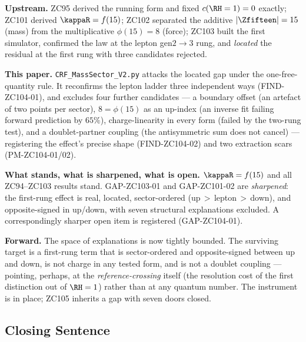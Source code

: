\documentclass[12pt, a4paper]{article}
\begin{document}
\begin{genealogybox}[title={How ZC104 Sharpens the Mass-Sector Gap}]
\textbf{Upstream.}
ZC95 derived the running form and fixed $c(\RH=1)=0$ exactly; ZC101 derived
$\kappaR=f(15)$; ZC102 separated the additive $|\Zfifteen|=15$ (mass) from the
multiplicative $\phi(15)=8$ (force); ZC103 built the first simulator, confirmed
the law at the lepton gen$2{\to}3$ rung, and \emph{located} the residual at the
first rung with three candidates rejected.

\textbf{This paper.}
\texttt{CRF\_MassSector\_V2.py} attacks the located gap under the one-free-
quantity rule. It reconfirms the lepton ladder three independent ways
(FIND-ZC104-01), and excludes four further candidates --- a boundary offset (an
artefact of two points per sector), $8=\phi(15)$ as an up-index (an inverse fit
failing forward prediction by $65\%$), charge-linearity in every form (failed by
the two-rung test), and a doublet-partner coupling (the antisymmetric sum does
not cancel) --- registering the effect's precise shape (FIND-ZC104-02) and two
extraction scars (PM-ZC104-01/02).

\textbf{What stands, what is sharpened, what is open.}
$\kappaR=f(15)$ and all ZC94--ZC103 results stand. GAP-ZC103-01 and GAP-ZC101-02
are \emph{sharpened}: the first-rung effect is real, located, sector-ordered
(up$\,>\,$lepton$\,>\,$down), and opposite-signed in up/down, with seven
structural explanations excluded. A correspondingly sharper open item is
registered (GAP-ZC104-01).

\textbf{Forward.}
The space of explanations is now tightly bounded. The surviving target is a
first-rung term that is sector-ordered and opposite-signed between up and down,
is not charge in any tested form, and is not a doublet coupling --- pointing,
perhaps, at the \emph{reference-crossing} itself (the resolution cost of the
first distinction out of $\RH=1$) rather than at any quantum number. The
instrument is in place; ZC105 inherits a gap with seven doors closed.
\end{genealogybox}

\subsection{Closing Sentence}
\end{document}
